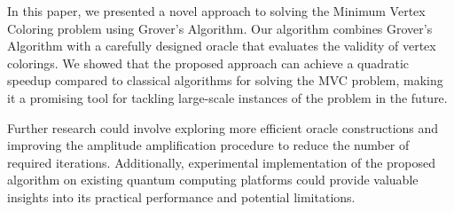 In this paper, we presented a novel approach to solving the Minimum Vertex Coloring problem using Grover's Algorithm. Our algorithm combines Grover's Algorithm with a carefully designed oracle that evaluates the validity of vertex colorings. We showed that the proposed approach can achieve a quadratic speedup compared to classical algorithms for solving the MVC problem, making it a promising tool for tackling large-scale instances of the problem in the future.

Further research could involve exploring more efficient oracle constructions and improving the amplitude amplification procedure to reduce the number of required iterations. Additionally, experimental implementation of the proposed algorithm on existing quantum computing platforms could provide valuable insights into its practical performance and potential limitations.

